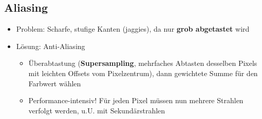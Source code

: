 \subsection{Aliasing}%
\label{rt:sub:aliasing}

\begin{itemize}
	\item Problem: Scharfe, stufige Kanten (\glqq jaggies\grqq), da nur \textbf{grob abgetastet} wird
	\item Lösung: Anti-Aliasing
	\begin{itemize}
		\item Überabtastung (\textbf{Supersampling}, mehrfaches Abtasten desselben Pixels mit leichten Offsets vom Pixelzentrum), dann gewichtete Summe für den Farbwert wählen
		\item Performance-intensiv! Für jeden Pixel müssen nun mehrere Strahlen verfolgt werden, u.U. mit Sekundärstrahlen
	\end{itemize}
\end{itemize}